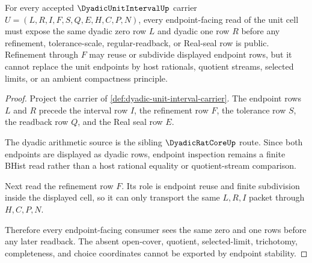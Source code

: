 \begin{theorem}
\label{thm:dyadic-unit-interval-endpoint-stability}
For every accepted $\DyadicUnitIntervalUp$ carrier $U=(L,R,I,F,S,Q,E,H,C,P,N)$, every endpoint-facing read of the unit cell must expose the same dyadic zero row $L$ and dyadic one row $R$ before any refinement, tolerance-scale, regular-readback, or Real-seal row is public. Refinement through $F$ may reuse or subdivide displayed endpoint rows, but it cannot replace the unit endpoints by host rationals, quotient streams, selected limits, or an ambient compactness principle.
\end{theorem}
\begin{proof}
Project the carrier of \autoref{def:dyadic-unit-interval-carrier}. The endpoint rows $L$ and $R$ precede the interval row $I$, the refinement row $F$, the tolerance row $S$, the readback row $Q$, and the Real seal row $E$.

The dyadic arithmetic source is the sibling $\DyadicRatCoreUp$ route. Since both endpoints are displayed as dyadic rows, endpoint inspection remains a finite BHist read rather than a host rational equality or quotient-stream comparison.

Next read the refinement row $F$. Its role is endpoint reuse and finite subdivision inside the displayed cell, so it can only transport the same $L,R,I$ packet through $H,C,P,N$.

Therefore every endpoint-facing consumer sees the same zero and one rows before any later readback. The absent open-cover, quotient, selected-limit, trichotomy, completeness, and choice coordinates cannot be exported by endpoint stability.
\end{proof}

